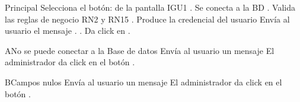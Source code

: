 	\begin{UCtrayectoria}{Principal}
	\UCpaso[\UCactor] Selecciona el botón:   de la pantalla IGU1 .	
		\UCpaso[\UCsist] Se conecta a la BD .
		\UCpaso[\UCsist] Valida las reglas de negocio RN2 y RN15 .
		\UCpaso[\UCsist] Produce la credencial del usuario
		\UCpaso[\UCsist] Envía al usuario el mensaje . .
		\UCpaso[\UCactor]Da click en .

		\end{UCtrayectoria}		
		\begin{UCtrayectoriaA}{A}{No se puede conectar a la Base de datos}
			\UCpaso[\UCsist] Envía al usuario un mensaje 
			\UCpaso[\UCsist] El administrador da click en el botón .
		\end{UCtrayectoriaA}
		
		\begin{UCtrayectoriaA}{B}{Campos nulos}
			\UCpaso[\UCsist] Envía al usuario un mensaje 
			\UCpaso[\UCsist] El administrador da click en el botón .
		\end{UCtrayectoriaA}
		
		





